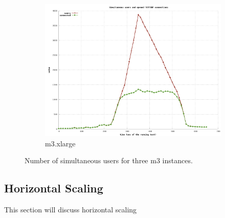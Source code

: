 \documentclass[dvips,12pt]{article}
\begin{document}
\begin{figure}[h!]
\begin{subfigure}[b]{0.3\textwidth}
        \includegraphics[width=\textwidth]{images/users_simul_xlarge.png}
        \caption{m3.xlarge}
    \end{subfigure}
    \caption{Number of simultaneous users for three m3 instances.}
\end{figure}




%

\newpage
\subsection{Horizontal Scaling}

This section will discuss horizontal scaling
\end{document}
